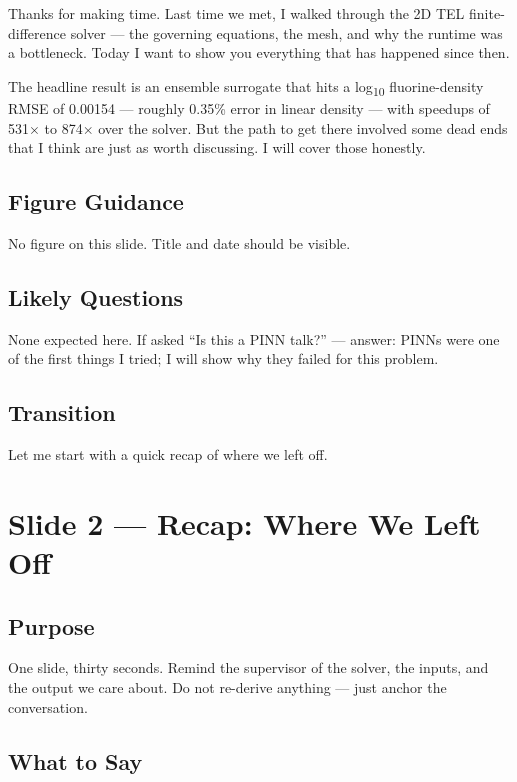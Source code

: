 \documentclass[12pt,a4paper]{article}
\begin{document}
Thanks for making time. Last time we met, I walked through the 2D TEL
finite-difference solver --- the governing equations, the mesh, and why
the runtime was a bottleneck. Today I want to show you everything
that has happened since then.

The headline result is an ensemble surrogate that hits a
log\textsubscript{10} fluorine-density RMSE of 0.00154 --- roughly
0.35\% error in linear density --- with speedups of 531$\times$ to
874$\times$ over the solver. But the path to get there involved some
dead ends that I think are just as worth discussing. I will cover
those honestly.

\subsection*{Figure Guidance}
No figure on this slide. Title and date should be visible.

\subsection*{Likely Questions}
None expected here. If asked ``Is this a PINN talk?'' --- answer:
PINNs were one of the first things I tried; I will show why they
failed for this problem.

\subsection*{Transition}
Let me start with a quick recap of where we left off.

\clearpage

\section{Slide 2 --- Recap: Where We Left Off}
\label{sec:slide2}

\subsection*{Purpose}
One slide, thirty seconds. Remind the supervisor of the solver,
the inputs, and the output we care about. Do not re-derive
anything --- just anchor the conversation.

\subsection*{What to Say}
\end{document}
